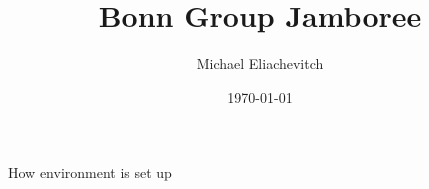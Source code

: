 \documentclass[aspectratio=169, 16pt]{beamer}
\author{Michael Eliachevitch}
\date{\today}
\title{Bonn Group Jamboree}
\institute{Physikalisches Institut --- Rheinische Friedrich-Wilhelms-Universität Bonn}
\begin{document}
\maketitle
How environment is set up
\end{document}
